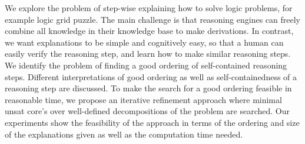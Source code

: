 We explore the problem of step-wise explaining how to solve logic problems, for example logic grid puzzle. The main challenge is that reasoning engines can freely combine all knowledge in their knowledge base to make derivations. In contrast, we want explanations to be simple and cognitively easy, so that a human can easily verify the reasoning step, and learn how to make similar reasoning steps.
We identify the problem of finding a good ordering of self-contained reasoning steps. Different interpretations of good ordering as well as self-containedness of a reasoning step are discussed. To make the search for a good ordering feasible in reasonable time, we propose an iterative refinement approach where minimal unsat core's over well-defined decompositions of the problem are searched. Our experiments show the feasibility of the approach in terms of the ordering and size of the explanations given as well as the computation time needed.
